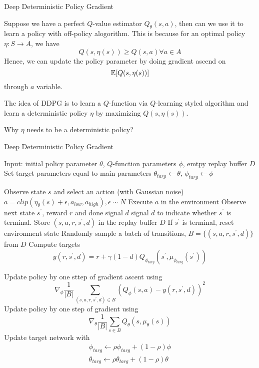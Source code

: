 \documentclass{article}
\begin{document}
Deep Deterministic Policy Gradient

Suppose we have a perfect $Q$-value estimator $Q_{\theta}(s, a)$, then
can we use it to learn a policy with off-policy alogorithm. This is 
because for an optimal policy $\eta : S \rightarrow A$, we have 
\[
    Q(s, \eta(s)) \geq Q(s, a) \forall a \in A
\]
Hence, we can update the policy parameter by doing gradient ascend on
\[
    \mathbb{E}[Q(s, \eta(s))]
\]
through $a$ variable. 


The idea of DDPG is to learn a $Q$-function via $Q$-learning styled 
algorithm and learn a deterministic policy $\eta$ by maximizing 
$Q(s, \eta(s))$. 

Why $\eta$ needs to be a deterministic policy? 

\begin{algorithm}[H]
\caption{Deep Deterministic Policy Gradient}
\label{alg}
\end{algorithm}

\begin{algorithmic}
\STATE Input: initial policy parameter $\theta$, $Q$-function 
parameters $\phi$, emtpy replay buffer $D$
\STATE Set target parameters equal to main parameters 
$\theta_{targ} \leftarrow \theta$, $\phi_{targ} \leftarrow \phi$

\REPEAT
\STATE Observe state $s$ and select an action (with Gaussian noise)
$a = clip(\eta_{\theta}(s) + \epsilon, a_{low}, a_{high}), 
\epsilon \sim N$
\STATE Execute $a$ in the environment
\STATE Observe next state $s^{\prime}$, reward $r$ and done signal 
$d$ signal $d$ to indicate whether $s^{\prime}$ is terminal.
\STATE Store $(s, a, r, s^{\prime}, d)$ in the replay buffer $D$
\STATE If $s^{\prime}$ is terminal, reset environment state 
\STATE Randomly sample a batch of transitions, 
$B = \{(s, a, r, s^{\prime}, d)\}$ from $D$
\STATE Compute targets
\[
    y(r, s^{\prime}, d) = r + \gamma(1-d)Q_{\phi_{targ}}(
        s^{\prime}, \mu_{\phi_{targ}}(s^{\prime})
        )
\]

\STATE Update policy by one sttep of gradient ascent using
\[
\nabla_{\phi}\frac{1}{|B|}\sum_{(s,a,r,s^{\prime},d)\in B}
(Q_{\phi}(s, a) - y(r, s^{\prime}, d))^2
\]
\STATE Update policy by one step of gradient using
\[
    \nabla_{\theta} \frac{1}{|B|}\sum_{s\in B} 
        Q_{\theta}(s, \mu_{\theta}(s))
\]
\STATE Update target network with 
\begin{align}
    \phi_{targ} \leftarrow \rho \phi_{targ} + (1-\rho)\phi \\
    \theta_{targ} \leftarrow \rho \theta_{targ} + (1-\rho)\theta
\end{align}
\ENDFOR
\ENDIF
{}

\end{algorithmic}
\end{document}
